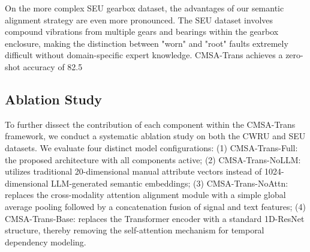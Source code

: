 \documentclass[journal]{IEEEtran}
\begin{document}
On the more complex SEU gearbox dataset, the advantages of our semantic alignment strategy are even more pronounced. The SEU dataset involves compound vibrations from multiple gears and bearings within the gearbox enclosure, making the distinction between "worn" and "root" faults extremely difficult without domain-specific expert knowledge. CMSA-Trans achieves a zero-shot accuracy of 82.5%

\subsection{Ablation Study}
To further dissect the contribution of each component within the CMSA-Trans framework, we conduct a systematic ablation study on both the CWRU and SEU datasets. We evaluate four distinct model configurations: (1) CMSA-Trans-Full: the proposed architecture with all components active; (2) CMSA-Trans-NoLLM: utilizes traditional 20-dimensional manual attribute vectors instead of 1024-dimensional LLM-generated semantic embeddings; (3) CMSA-Trans-NoAttn: replaces the cross-modality attention alignment module with a simple global average pooling followed by a concatenation fusion of signal and text features; (4) CMSA-Trans-Base: replaces the Transformer encoder with a standard 1D-ResNet structure, thereby removing the self-attention mechanism for temporal dependency modeling.
\end{document}

